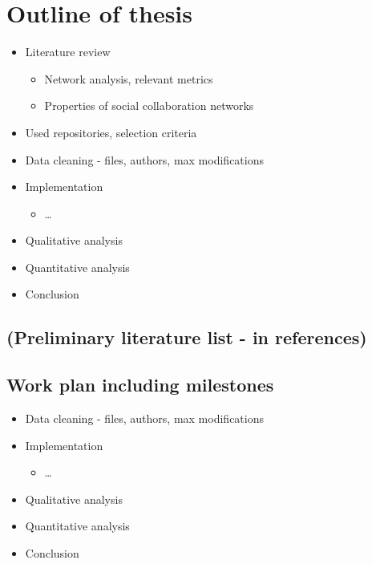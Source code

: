 \section{Outline of thesis}
\begin{itemize}
    \item Literature review
    \begin{itemize}
        \item Network analysis, relevant metrics
        \item Properties of social collaboration networks
    \end{itemize}
    \item Used repositories, selection criteria
    \item Data cleaning - files, authors, max modifications
    \item Implementation
    \begin{itemize}
        \item \dots
    \end{itemize}
    \item Qualitative analysis
    \item Quantitative analysis
    \item Conclusion
\end{itemize}

\subsection{(Preliminary literature list - in references)}

\subsection{Work plan including milestones}

\begin{itemize}
    \item Data cleaning - files, authors, max modifications
    \item Implementation
    \begin{itemize}
        \item \dots
    \end{itemize}
    \item Qualitative analysis
    \item Quantitative analysis
    \item Conclusion
\end{itemize}